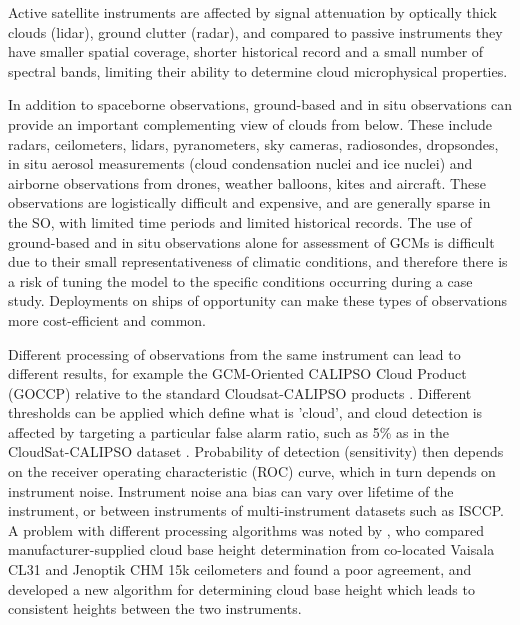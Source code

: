 \noindent Active satellite instruments are affected by signal attenuation by
optically thick
clouds (lidar), ground clutter (radar), and compared to passive instruments they have smaller spatial coverage,
shorter historical record and a small number of spectral bands, limiting their
ability to determine cloud microphysical properties.

In addition to spaceborne observations, ground-based and in situ
observations can provide an important complementing view of clouds from below.
These include radars, ceilometers, lidars,
pyranometers, sky cameras, radiosondes, dropsondes, in situ aerosol measurements
(cloud condensation nuclei and ice nuclei) and airborne observations from
drones, weather balloons, kites and aircraft. These observations are logistically
difficult and expensive, and are generally sparse in the SO, with
limited time periods and limited historical records. The use of ground-based and
in situ observations alone for assessment of GCMs is difficult due to their
small representativeness of climatic conditions, and therefore there
is a risk of tuning the model to the specific conditions occurring during a
case study. Deployments on ships of opportunity can make these types
of observations more cost-efficient and common.

Different processing of observations from the same instrument can lead
to different results, for example the
GCM-Oriented CALIPSO Cloud Product (GOCCP) relative to the standard
Cloudsat-CALIPSO products \citep{chepfer2010}.
Different thresholds can be applied which define what is 'cloud',
and cloud detection is affected by targeting a particular false alarm ratio,
such as 5\% as in the CloudSat-CALIPSO dataset \citep{hagihara2010}.
Probability of detection (sensitivity) then depends on the receiver operating
characteristic (ROC) curve, which in turn depends on instrument
noise. Instrument noise ana bias can vary over lifetime of the instrument,
or between instruments of multi-instrument datasets such as ISCCP.
A problem with different processing
algorithms was noted by \cite{martucci2010}, who compared
manufacturer-supplied cloud base height
determination from co-located Vaisala CL31 and Jenoptik CHM 15k ceilometers
and found a poor agreement, and developed a new algorithm for determining
cloud base height which leads to consistent heights between the two instruments.

